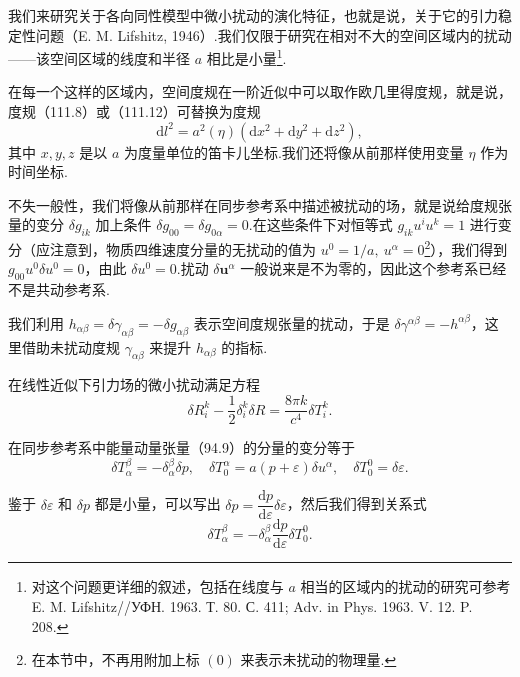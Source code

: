 我们来研究关于各向同性模型中微小扰动的演化特征，也就是说，关于它的引力稳定性问题（E. M. Lifshitz, 1946）.我们仅限于研究在相对不大的空间区域内的扰动——该空间区域的线度和半径 $a$ 相比是小量\footnote{对这个问题更详细的叙述，包括在线度与 $a$ 相当的区域内的扰动的研究可参考 E. M. Lifshitz//УФН. 1963. Т. 80. С. 411; Adv. in Phys. 1963. V. 12. P. 208.}.

在每一个这样的区域内，空间度规在一阶近似中可以取作欧几里得度规，就是说，度规（111.8）或（111.12）可替换为度规
\begin{equation}
  \mathrm{d}l^{2}=a^{2}(\eta)
  (\mathrm{d}x^{2}+\mathrm{d}y^{2}+\mathrm{d}z^{2}),
\end{equation}
其中 $x,y,z$ 是以 $a$ 为度量单位的笛卡儿坐标.我们还将像从前那样使用变量 $\eta$ 作为时间坐标.

不失一般性，我们将像从前那样在同步参考系中描述被扰动的场，就是说给度规张量的变分 $\delta g_{ik}$ 加上条件 $\delta g_{00}=\delta g_{0\alpha}=0$.在这些条件下对恒等式 $g_{ik}u^{i}u^{k}=1$ 进行变分（应注意到，物质四维速度分量的无扰动的值为 $u^{0}=1/a,\ u^{\alpha}=0$\footnote{在本节中，不再用附加上标 $(0)$ 来表示未扰动的物理量.}），我们得到 $g_{00}u^{0}\delta u^{0}=0$，由此 $\delta u^{0}=0$.扰动 $\delta\boldsymbol{u}^{\alpha}$ 一般说来是不为零的，因此这个参考系已经不是共动参考系.

我们利用 $h_{\alpha\beta}=\delta\gamma_{\alpha\beta}=-\delta g_{\alpha\beta}$ 表示空间度规张量的扰动，于是 $\delta\gamma^{\alpha\beta}=-h^{\alpha\beta}$，这里借助未扰动度规 $\gamma_{\alpha\beta}$ 来提升 $h_{\alpha\beta}$ 的指标.

在线性近似下引力场的微小扰动满足方程
\begin{equation}
  \delta R_{i}^{k}-\frac{1}{2}\delta_{i}^{k}\delta R
  =\frac{8\pi k}{c^{4}}\delta T_{i}^{k}.
\end{equation}

在同步参考系中能量动量张量（94.9）的分量的变分等于
\begin{equation}
  \delta T_{\alpha}^{\beta}=-\delta_{\alpha}^{\beta}\delta p,\quad
  \delta T_{0}^{\alpha}=a(p+\varepsilon)\delta u^{\alpha},\quad
  \delta T_{0}^{0}=\delta\varepsilon.
\end{equation}

鉴于 $\delta\varepsilon$ 和 $\delta p$ 都是小量，可以写出 $\delta p=\dfrac{\mathrm{d}p}{\mathrm{d}\varepsilon}\delta\varepsilon$，然后我们得到关系式
\begin{equation}
  \delta T_{\alpha}^{\beta}
  =-\delta_{\alpha}^{\beta}\frac{\mathrm{d}p}{\mathrm{d}\varepsilon}\delta T_{0}^{0}.
\end{equation}

